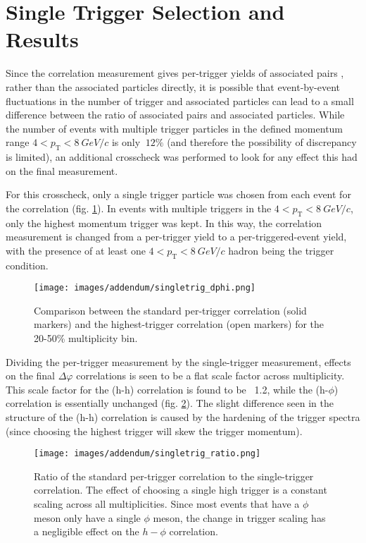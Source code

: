 \documentclass[ALICE,manyauthors]{ALICE_analysis_notes}
\begin{document}
\section{Single Trigger Selection and Results}

Since the correlation measurement gives per-trigger yields of associated pairs , rather than the associated particles directly, it is possible that event-by-event fluctuations in the number of trigger and associated particles can lead to a small difference between the ratio of associated pairs and associated particles. While the number of events with multiple trigger particles in the defined momentum range $4 < p_{\text{T}} < \SI{8}{GeV/c}$ is only $~12\%$ (and therefore the possibility of discrepancy is limited), an additional crosscheck was performed to look for any effect this had on the final measurement.

For this crosscheck, only a single trigger particle was chosen from each event for the correlation (fig. \ref{singletrigcorr}).  In events with multiple triggers in the $4 < p_{\text{T}} < \SI{8}{GeV/c}$, only the highest momentum trigger was kept.  In this way, the correlation measurement is changed from a per-trigger yield to a per-triggered-event yield, with the presence of at least one $4 < p_{\text{T}} < \SI{8}{GeV/c}$ hadron being the trigger condition.

\begin{figure}[!htb]
\centering
\texttt{[image: images/addendum/singletrig\_dphi.png]}
\caption{Comparison between the standard per-trigger correlation (solid markers) and the highest-trigger correlation (open markers) for the 20-50\% multiplicity bin.}
\label{singletrigcorr}
\end{figure}

Dividing the per-trigger measurement by the single-trigger measurement,  effects on the final $\Delta\varphi$ correlations is seen to be a flat scale factor across multiplicity. This scale factor for the (h-h) correlation is found to be ~1.2, while the (h-$\phi$) correlation is essentially unchanged (fig. \ref{singletrigratio}).  The slight difference seen in the structure of the (h-h) correlation is caused by the hardening of the trigger spectra (since choosing the highest trigger will skew the trigger momentum).

\begin{figure}[!htb]
\centering
\texttt{[image: images/addendum/singletrig\_ratio.png]}
\caption{Ratio of the standard per-trigger correlation to the single-trigger correlation. The effect of choosing a single high trigger is a constant scaling across all multiplicities.  Since most events that have a $\phi$ meson only have a single $\phi$ meson, the change in trigger scaling has a negligible effect on the $h-\phi$ correlation.}
\label{singletrigratio}
\end{figure}
\end{document}
